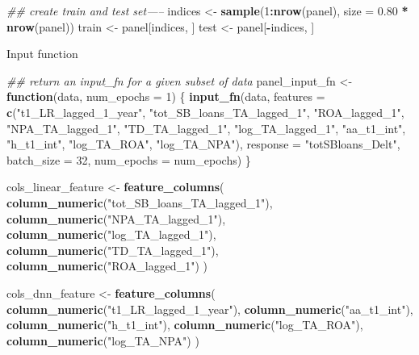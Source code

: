 \documentclass[]{article}
\newenvironment{Shaded}{\begin{snugshade}}{\end{snugshade}}
\newcommand{\CommentTok}[1]{\textcolor[rgb]{0.56,0.35,0.01}{\textit{#1}}}
\newcommand{\ControlFlowTok}[1]{\textcolor[rgb]{0.13,0.29,0.53}{\textbf{#1}}}
\newcommand{\DataTypeTok}[1]{\textcolor[rgb]{0.13,0.29,0.53}{#1}}
\newcommand{\DecValTok}[1]{\textcolor[rgb]{0.00,0.00,0.81}{#1}}
\newcommand{\FloatTok}[1]{\textcolor[rgb]{0.00,0.00,0.81}{#1}}
\newcommand{\KeywordTok}[1]{\textcolor[rgb]{0.13,0.29,0.53}{\textbf{#1}}}
\newcommand{\NormalTok}[1]{#1}
\newcommand{\OperatorTok}[1]{\textcolor[rgb]{0.81,0.36,0.00}{\textbf{#1}}}
\newcommand{\StringTok}[1]{\textcolor[rgb]{0.31,0.60,0.02}{#1}}
\begin{document}
\begin{Shaded}
\begin{Highlighting}[]
\CommentTok{## create train and test set-----}
\NormalTok{indices <-}\StringTok{ }\KeywordTok{sample}\NormalTok{(}\DecValTok{1}\OperatorTok{:}\KeywordTok{nrow}\NormalTok{(panel), }\DataTypeTok{size =} \FloatTok{0.80} \OperatorTok{*}\StringTok{ }\KeywordTok{nrow}\NormalTok{(panel))}
\NormalTok{train <-}\StringTok{ }\NormalTok{panel[indices, ]}
\NormalTok{test  <-}\StringTok{ }\NormalTok{panel[}\OperatorTok{-}\NormalTok{indices, ]}
\end{Highlighting}
\end{Shaded}

Input function

\begin{Shaded}
\begin{Highlighting}[]
\CommentTok{## return an input_fn for a given subset of data}
\NormalTok{panel_input_fn <-}\StringTok{ }\ControlFlowTok{function}\NormalTok{(data, }\DataTypeTok{num_epochs =} \DecValTok{1}\NormalTok{) \{}
  \KeywordTok{input_fn}\NormalTok{(data,}
           \DataTypeTok{features =} \KeywordTok{c}\NormalTok{(}\StringTok{"t1_LR_lagged_1_year"}\NormalTok{, }\StringTok{"tot_SB_loans_TA_lagged_1"}\NormalTok{, }\StringTok{"ROA_lagged_1"}\NormalTok{, }\StringTok{"NPA_TA_lagged_1"}\NormalTok{, }\StringTok{"TD_TA_lagged_1"}\NormalTok{, }\StringTok{"log_TA_lagged_1"}\NormalTok{, }\StringTok{"aa_t1_int"}\NormalTok{, }\StringTok{"h_t1_int"}\NormalTok{, }\StringTok{"log_TA_ROA"}\NormalTok{, }\StringTok{"log_TA_NPA"}\NormalTok{),}
           \DataTypeTok{response =} \StringTok{"totSBloans_Delt"}\NormalTok{,}
           \DataTypeTok{batch_size =} \DecValTok{32}\NormalTok{,}
           \DataTypeTok{num_epochs =}\NormalTok{ num_epochs)}
\NormalTok{\}}
\end{Highlighting}
\end{Shaded}

\begin{Shaded}
\begin{Highlighting}[]
\NormalTok{cols_linear_feature <-}\StringTok{ }\KeywordTok{feature_columns}\NormalTok{(}
    \KeywordTok{column_numeric}\NormalTok{(}\StringTok{"tot_SB_loans_TA_lagged_1"}\NormalTok{),}
    \KeywordTok{column_numeric}\NormalTok{(}\StringTok{"NPA_TA_lagged_1"}\NormalTok{),}
    \KeywordTok{column_numeric}\NormalTok{(}\StringTok{"log_TA_lagged_1"}\NormalTok{),}
    \KeywordTok{column_numeric}\NormalTok{(}\StringTok{"TD_TA_lagged_1"}\NormalTok{),}
    \KeywordTok{column_numeric}\NormalTok{(}\StringTok{"ROA_lagged_1"}\NormalTok{)}
\NormalTok{    )}

\NormalTok{cols_dnn_feature <-}\StringTok{ }\KeywordTok{feature_columns}\NormalTok{(}
    \KeywordTok{column_numeric}\NormalTok{(}\StringTok{"t1_LR_lagged_1_year"}\NormalTok{),}
    \KeywordTok{column_numeric}\NormalTok{(}\StringTok{"aa_t1_int"}\NormalTok{),}
    \KeywordTok{column_numeric}\NormalTok{(}\StringTok{"h_t1_int"}\NormalTok{),}
    \KeywordTok{column_numeric}\NormalTok{(}\StringTok{"log_TA_ROA"}\NormalTok{),}
    \KeywordTok{column_numeric}\NormalTok{(}\StringTok{"log_TA_NPA"}\NormalTok{)}
\NormalTok{    )}
\end{Highlighting}
\end{Shaded}
\end{document}
